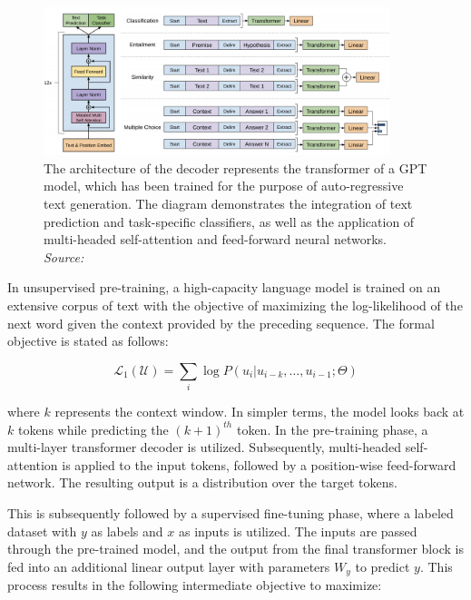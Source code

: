 \begin{figure}[h]
    \centering
    \includegraphics[width=0.9\textwidth]{images/llms/gpt.png}
    \caption{The architecture of the decoder represents the transformer of a GPT model, which has been trained for the purpose of auto-regressive text generation. The diagram demonstrates the integration of text prediction and task-specific classifiers, as well as the application of multi-headed self-attention and feed-forward neural networks. \textit{Source:} \cite{radford2018improving}}
    \label{fig:transformer_architecture}
\end{figure}

In unsupervised pre-training, a high-capacity language model is trained on an extensive corpus of text with the objective of maximizing the log-likelihood of the next word given the context provided by the preceding sequence. The formal objective is stated as follows:

\begin{equation}
    \mathcal{L}_1(\mathcal{U}) = \sum_{i} \log P(u_i | u_{i-k}, \ldots, u_{i-1}; \Theta)
\end{equation}

where \( k \) represents the context window. In simpler terms, the model looks back at \( k \) tokens while predicting the \((k+1)^{th}\) token. In the pre-training phase, a multi-layer transformer decoder is utilized. Subsequently, multi-headed self-attention is applied to the input tokens, followed by a position-wise feed-forward network. The resulting output is a distribution over the target tokens.

This is subsequently followed by a supervised fine-tuning phase, where a labeled dataset with \( y \) as labels and \( x \) as inputs is utilized. The inputs are passed through the pre-trained model, and the output from the final transformer block is fed into an additional linear output layer with parameters \( W_y \) to predict \( y \). This process results in the following intermediate objective to maximize:

